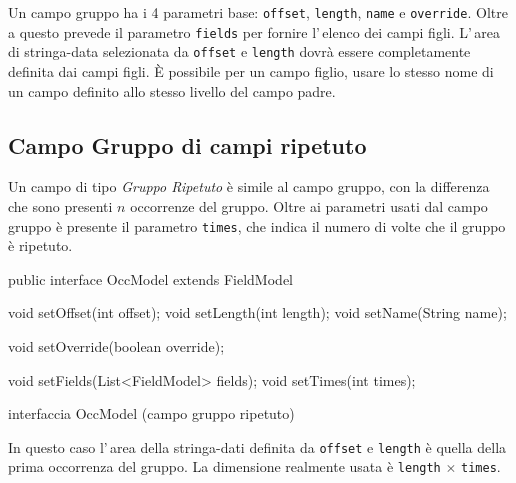 \documentclass[a4paper,10pt]{report}
\newif\ifesource
\newenvironment{elisting}[1][!htb]
  {\captionsetup{aboveskip=0pt}\begin{listing}[#1]}
  {\end{listing}%
}
\begin{document}
Un campo gruppo ha i 4 parametri base: \verb!offset!, \verb!length!, 
\verb!name! e \verb!override!.
Oltre a questo prevede il parametro \verb!fields! per fornire l'\,elenco dei 
campi figli.
L'\,area di stringa-data selezionata da \verb!offset! e \verb!length! dovrà
essere completamente definita dai campi figli.
È possibile per un campo figlio, usare lo stesso nome di un campo definito
allo stesso livello del campo padre. 

\subsection{Campo Gruppo di campi ripetuto}
Un campo di tipo \textsl{Gruppo Ripetuto} è simile al campo gruppo, con la 
differenza che sono presenti $n$ occorrenze del gruppo.
Oltre ai parametri usati dal campo gruppo è presente il parametro \verb!times!,
che indica il numero di volte che il gruppo è ripetuto.

\ifesource
\begin{figure*}[!htb]
\begin{lstlisting}[language=java, 
caption=interfaccia OccModel (campo gruppo ripetuto), 
label=lst:OccModel]
public interface OccModel extends  FieldModel {
    void setOffset(int offset);
    void setLength(int length);
    void setName(String name);
    
    void setOverride(boolean override);
    
    void setFields(List<FieldModel> fields);
    void setTimes(int times);
}
\end{lstlisting}\index{OccModel}
\end{figure*}
\else
\begin{elisting}
\begin{javacode}
public interface OccModel extends  FieldModel {
    void setOffset(int offset);
    void setLength(int length);
    void setName(String name);
    
    void setOverride(boolean override);
    
    void setFields(List<FieldModel> fields);
    void setTimes(int times);
}
\end{javacode}
\caption{interfaccia OccModel (campo gruppo ripetuto)}
\label{lst:OccModel}
\end{elisting}
\fi

In questo caso l'\,area della stringa-dati definita da \verb!offset! e 
\verb!length! è quella della prima occorrenza del gruppo. La dimensione realmente
usata è \verb!length! $\times$ \verb!times!.
\end{document}
